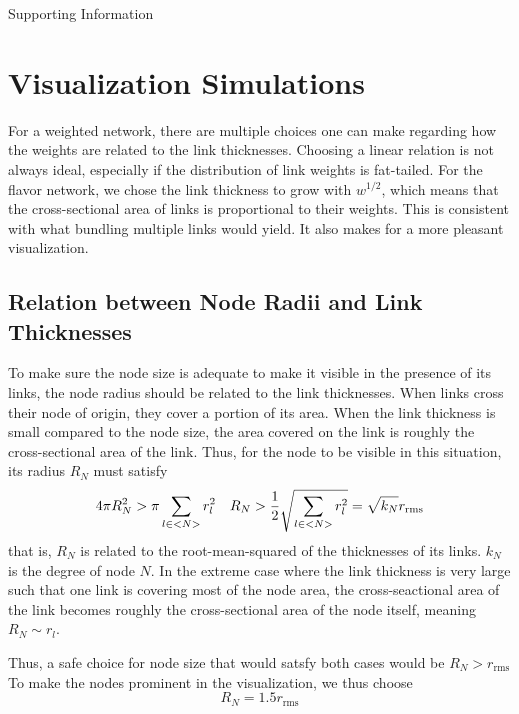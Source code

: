 \documentclass[nofootinbib,preprint,floatfix,titlepage,superscriptaddress]{revtex4} %
\begin{document}
\newpage


\appendix
{\Huge Supporting Information}

\section{Visualization Simulations\label{ap:params}}
For a weighted network, there are multiple choices one can make regarding how the weights are related to the link thicknesses.
Choosing a linear relation is not always ideal, especially if the distribution of link weights is fat-tailed. 
For the flavor network, we chose the link thickness to grow with $w^{1/2}$, which means that the cross-sectional area of links is proportional to their weights. 
This is consistent with what bundling multiple links would yield. 
It also makes for a more pleasant visualization. 

\subsection{Relation between Node Radii and Link Thicknesses}
To make sure the node size is adequate to make it visible in the presence of its links, the node radius should be related to the link thicknesses. 
When links cross their node of origin, they cover a portion of its area.
When the link thickness is small compared to the node size, the area covered on the link is roughly the cross-sectional area of the link. 
Thus, for the node to be visible in this situation, its radius $R_N$ must satisfy
\begin{equation}
    4 \pi R_N^2 > \pi \sum_{l\in <N>} r_l^2 \quad R_N > {1\over 2} \sqrt{\sum_{l\in <N>} r_l^2} = \sqrt{k_N} r_{\mathrm{rms}}  
\end{equation}
that is, $R_N$ is related to the root-mean-squared of the thicknesses of its links. $k_N$ is the degree of node $N$.  
In the extreme case where the link thickness is very large such that one link is covering most of the node area, the cross-seactional area of the link becomes roughly the cross-sectional area of the node itself, meaning $R_N \sim r_l$. 

Thus, a safe choice for node size that would satsfy both cases would be 
$R_N > r_{\mathrm{rms}}$
To make the nodes prominent in the visualization, we thus choose 
\[R_N = 1.5 r_{\mathrm{rms}}\]
\end{document}
